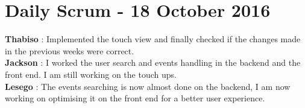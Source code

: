 \documentclass[10pt,a4paper]{article}
\begin{document}
\section{Daily Scrum - 18 October 2016}
\textbf{Thabiso} : Implemented the touch view and finally checked if the changes made in the previous weeks were correct.\\

\textbf{Jackson} : I worked the user search and events handling in the backend and the front end. I am  still working on the touch ups.\\

\textbf{Lesego} : The events searching is now almost done on the backend, I am now working on optimising it on the front end for a better 
user experience.\\
\end{document}
